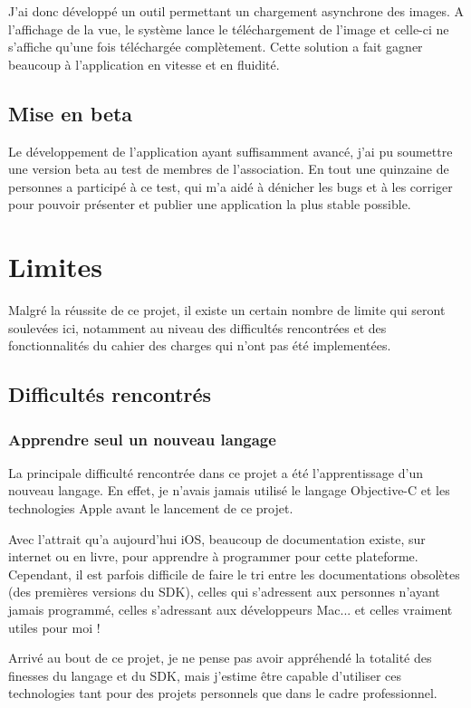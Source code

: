 \documentclass[11pt, french]{report}
\begin{document}
J'ai donc développé un outil permettant un chargement asynchrone des images. A l'affichage de la vue, le système lance le téléchargement de l'image et celle-ci ne s'affiche qu'une fois téléchargée complètement. Cette solution a fait gagner beaucoup à l'application en vitesse et en fluidité.

\subsection{Mise en beta}

Le développement de l'application ayant suffisamment avancé, j'ai pu soumettre une version beta au test de membres de l'association. En tout une quinzaine de personnes a participé à ce test, qui m'a aidé à dénicher les bugs et à les corriger pour pouvoir présenter et publier une application la plus stable possible.

\section{Limites}

Malgré la réussite de ce projet, il existe un certain nombre de limite qui seront soulevées ici, notamment au niveau des difficultés rencontrées et des fonctionnalités du cahier des charges qui n'ont pas été implementées.

\subsection{Difficultés rencontrés}

\subsubsection{Apprendre seul un nouveau langage}

La principale difficulté rencontrée dans ce projet a été l'apprentissage d'un nouveau langage. En effet, je n'avais jamais utilisé le langage Objective-C et les technologies Apple avant le lancement de ce projet.

Avec l'attrait qu'a aujourd'hui iOS, beaucoup de documentation existe, sur internet ou en livre, pour apprendre à programmer pour cette plateforme. Cependant, il est parfois difficile de faire le tri entre les documentations obsolètes (des premières versions du SDK), celles qui s'adressent aux personnes n'ayant jamais programmé, celles s'adressant aux développeurs Mac... et celles vraiment utiles pour moi !

Arrivé au bout de ce projet, je ne pense pas avoir appréhendé la totalité des finesses du langage et du SDK, mais j'estime être capable d'utiliser ces technologies tant pour des projets personnels que dans le cadre professionnel.
\end{document}
